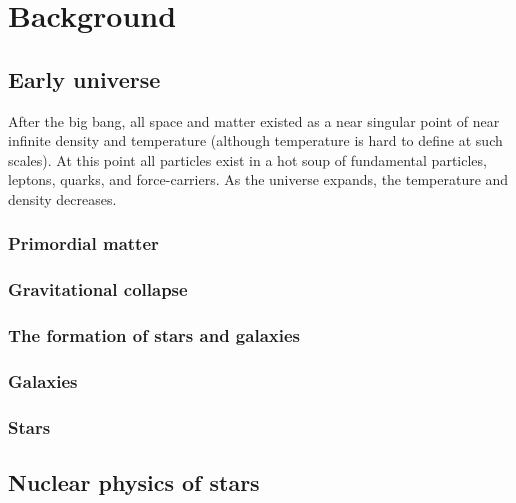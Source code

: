 

\section{Background}

\subsection{Early universe}
After the big bang, all space and matter existed as a near singular point of near infinite density and temperature (although temperature is hard to define at such scales).
At this point all particles exist in a hot soup of fundamental particles, leptons, quarks, and force-carriers.
As the universe expands, the temperature and density decreases.

\subsubsection{Primordial matter}
\subsubsection{Gravitational collapse}
\subsubsection{The formation of stars and galaxies}
\subsubsection{Galaxies}
\subsubsection{Stars}

\subsection{Nuclear physics of stars}
